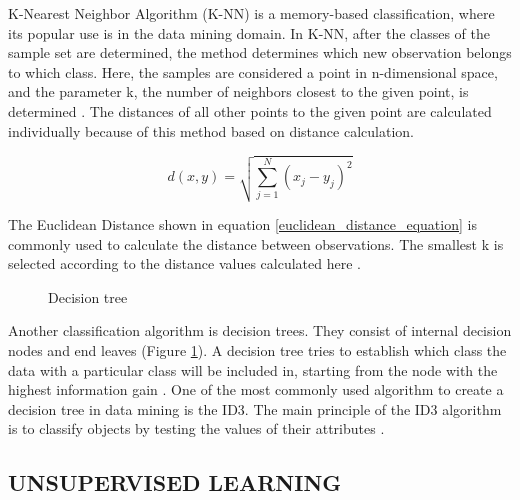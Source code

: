 K-Nearest Neighbor Algorithm (K-NN) is a memory-based classification, where its popular use is in the data mining domain. In K-NN, after the classes of the sample set are determined, the method determines which new observation belongs to which class. Here, the samples are considered a point in n-dimensional space, and the parameter k, the number of neighbors closest to the given point, is determined \cite{cover1967nearest}. The distances of all other points to the given point are calculated individually because of this method based on distance calculation. 

\begin{equation} \label{euclidean_distance_equation}
d(x,y) = \sqrt{\sum_{j=1}^{N}(x_j - y_j)^2}
\end{equation}

The Euclidean Distance shown in equation \ref{euclidean_distance_equation} is commonly used to calculate the distance between observations. The smallest k is selected according to the distance values calculated here \cite{hall2008choice}.

\begin{figure}[htbp]
\centering
{}
\caption{Decision tree}
\label{fig:DecisionTreeExample}
\end{figure}

Another classification algorithm is decision trees. They consist of internal decision nodes and end leaves (Figure \ref{fig:DecisionTreeExample}). A decision tree tries to establish which class the data with a particular class will be included in, starting from the node with the highest information gain \cite{hssina2014comparative}. One of the most commonly used algorithm to create a decision tree in data mining is the ID3. The main principle of the ID3 algorithm is to classify objects by testing the values of their attributes \cite{jin2009improved}.

\subsection{UNSUPERVISED LEARNING}

